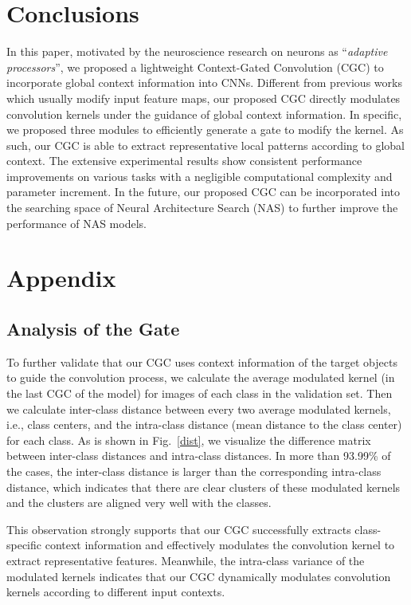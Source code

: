 \documentclass[runningheads]{llncs}
\begin{document}
\section{Conclusions}
In this paper, motivated by the neuroscience research on neurons as ``\textit{adaptive processors}'', we proposed a lightweight Context-Gated Convolution (CGC) to incorporate global context information into CNNs. Different from previous works which usually modify input feature maps, our proposed CGC directly modulates convolution kernels under the guidance of global context information. In specific, we proposed three modules to efficiently generate a gate to modify the kernel. As such, our CGC is able to extract representative local patterns according to global context. The extensive experimental results show consistent performance improvements on various tasks with a negligible computational complexity and parameter increment. In the future, our proposed CGC can be incorporated into the searching space of Neural Architecture Search (NAS) to further improve the performance of NAS models.




\appendix
\section{Appendix}






\subsection{Analysis of the Gate}
To further validate that our CGC uses context information of the target objects to guide the convolution process, we calculate the average modulated kernel (in the last CGC of the model) for images of each class in the validation set. Then we calculate inter-class  distance between every two average modulated kernels, i.e., class centers, and the intra-class  distance (mean distance to the class center) for each class. As is shown in Fig.~\ref{dist}, we visualize the difference matrix between inter-class distances and intra-class distances. In more than 93.99\% of the cases, the inter-class distance is larger than the corresponding intra-class distance, which indicates that there are clear clusters of these modulated kernels and the clusters are aligned very well with the classes.

This observation strongly supports that our CGC successfully extracts class-specific context information and effectively modulates the convolution kernel to extract representative features. Meanwhile, the intra-class variance of the modulated kernels indicates that our CGC dynamically modulates convolution kernels according to different input contexts.
\end{document}
